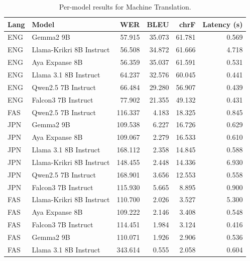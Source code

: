 \begin{table}[t]
\centering
\caption{Per-model results for Machine Translation.}
\label{tab:appendix-machine-translation-analysis}
\begin{tabular}{llrrrr}
\toprule
Lang & Model & WER & BLEU & chrF & Latency (s) \\
\midrule
ENG & Gemma2 9B & 57.915 & 35.073 & 61.781 & 0.569 \\
ENG & Llama-Krikri 8B Instruct & 56.508 & 34.872 & 61.666 & 4.718 \\
ENG & Aya Expanse 8B & 56.359 & 35.037 & 61.591 & 0.531 \\
ENG & Llama 3.1 8B Instruct & 64.237 & 32.576 & 60.045 & 0.441 \\
ENG & Qwen2.5 7B Instruct & 66.484 & 29.280 & 56.907 & 0.439 \\
ENG & Falcon3 7B Instruct & 77.902 & 21.355 & 49.132 & 0.431 \\
FAS & Qwen2.5 7B Instruct & 116.337 & 4.183 & 18.325 & 0.845 \\
JPN & Gemma2 9B & 109.538 & 6.227 & 16.726 & 0.629 \\
JPN & Aya Expanse 8B & 109.067 & 2.279 & 16.533 & 0.610 \\
JPN & Llama 3.1 8B Instruct & 168.112 & 2.358 & 14.845 & 0.588 \\
JPN & Llama-Krikri 8B Instruct & 148.455 & 2.448 & 14.336 & 6.930 \\
JPN & Qwen2.5 7B Instruct & 168.901 & 3.656 & 12.553 & 0.558 \\
JPN & Falcon3 7B Instruct & 115.930 & 5.665 & 8.895 & 0.900 \\
FAS & Llama-Krikri 8B Instruct & 110.700 & 2.026 & 3.527 & 5.300 \\
FAS & Aya Expanse 8B & 109.222 & 2.146 & 3.408 & 0.548 \\
FAS & Falcon3 7B Instruct & 114.451 & 1.984 & 3.124 & 0.416 \\
FAS & Gemma2 9B & 110.071 & 1.926 & 2.906 & 0.536 \\
FAS & Llama 3.1 8B Instruct & 343.614 & 0.555 & 2.058 & 0.604 \\
\bottomrule
\end{tabular}
\end{table}
